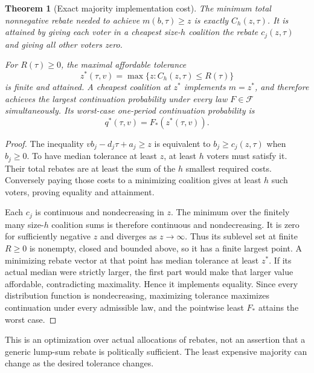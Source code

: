 \documentclass[11pt,a4paper]{article}
\newtheorem{theorem}{Theorem}[section]
\theoremstyle{definition}
\theoremstyle{remark}
\begin{document}
\begin{theorem}[Exact majority implementation cost]\label{th:coalition}
The minimum total nonnegative rebate needed to achieve $m(b,\tau)\geq z$ is exactly $C_h(z,\tau)$. It is attained by giving each voter in a cheapest size-$h$ coalition the rebate $c_j(z,\tau)$ and giving all other voters zero.

For $R(\tau)\geq0$, the maximal affordable tolerance
\[
 z^*(\tau,v)=\max\{z:C_h(z,\tau)\leq R(\tau)\}
\]
is finite and attained. A cheapest coalition at $z^*$ implements $m=z^*$, and therefore achieves the largest continuation probability under every law $F\in\mathcal F$ simultaneously. Its worst-case one-period continuation probability is
\[
 q^*(\tau,v)=F_*(z^*(\tau,v)).
\]
\end{theorem}
\begin{proof}
The inequality $v b_j-d_j\tau+a_j\geq z$ is equivalent to $b_j\geq c_j(z,\tau)$ when $b_j\geq0$. To have median tolerance at least $z$, at least $h$ voters must satisfy it. Their total rebates are at least the sum of the $h$ smallest required costs. Conversely paying those costs to a minimizing coalition gives at least $h$ such voters, proving equality and attainment.

Each $c_j$ is continuous and nondecreasing in $z$. The minimum over the finitely many size-$h$ coalition sums is therefore continuous and nondecreasing. It is zero for sufficiently negative $z$ and diverges as $z\to\infty$. Thus its sublevel set at finite $R\geq0$ is nonempty, closed and bounded above, so it has a finite largest point. A minimizing rebate vector at that point has median tolerance at least $z^*$. If its actual median were strictly larger, the first part would make that larger value affordable, contradicting maximality. Hence it implements equality. Since every distribution function is nondecreasing, maximizing tolerance maximizes continuation under every admissible law, and the pointwise least $F_*$ attains the worst case.
\end{proof}

This is an optimization over actual allocations of rebates, not an assertion that a generic lump-sum rebate is politically sufficient. The least expensive majority can change as the desired tolerance changes.
\end{document}
